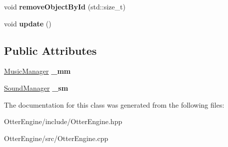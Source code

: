 \begin{DoxyCompactItemize}
\item 
void {\bfseries remove\+Object\+By\+Id} (std\+::size\+\_\+t)\hypertarget{class_otter_engine_1_1_engine_aa57d0d9f6a4eb14d9fb20bbe9a4e2b11}{}\label{class_otter_engine_1_1_engine_aa57d0d9f6a4eb14d9fb20bbe9a4e2b11}

\item 
void {\bfseries update} ()\hypertarget{class_otter_engine_1_1_engine_af2be9f91e9fc2bf1ea0ae35ebbb64bd0}{}\label{class_otter_engine_1_1_engine_af2be9f91e9fc2bf1ea0ae35ebbb64bd0}

\end{DoxyCompactItemize}
\subsection*{Public Attributes}
\begin{DoxyCompactItemize}
\item 
\hyperlink{class_music_manager}{Music\+Manager} {\bfseries \+\_\+mm}\hypertarget{class_otter_engine_1_1_engine_a52c1d27ee463678d5b6256404cddff35}{}\label{class_otter_engine_1_1_engine_a52c1d27ee463678d5b6256404cddff35}

\item 
\hyperlink{class_sound_manager}{Sound\+Manager} {\bfseries \+\_\+sm}\hypertarget{class_otter_engine_1_1_engine_a6ab6dc0ef635f40e7e01a7396ea69f53}{}\label{class_otter_engine_1_1_engine_a6ab6dc0ef635f40e7e01a7396ea69f53}

\end{DoxyCompactItemize}


The documentation for this class was generated from the following files\+:\begin{DoxyCompactItemize}
\item 
Otter\+Engine/include/Otter\+Engine.\+hpp\item 
Otter\+Engine/src/Otter\+Engine.\+cpp\end{DoxyCompactItemize}
